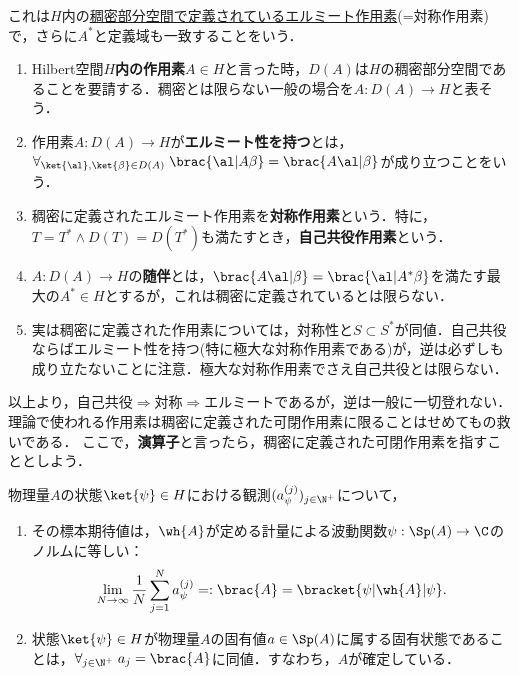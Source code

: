 \documentclass[uplatex,dvipdfmx]{jsreport}
\begin{document}
\begin{remark}
    これは$H$内の\underline{稠密部分空間で定義されているエルミート作用素}(=対称作用素)で，さらに$A^*$と定義域も一致することをいう．
    \begin{enumerate}
        \item Hilbert空間\textbf{$H$内の作用素}$A\in H$と言った時，$D(A)$は$H$の稠密部分空間であることを要請する．稠密とは限らない一般の場合を$A:D(A)\to H$と表そう．
        \item 作用素$A:D(A)\to H$が\textbf{エルミート性を持つ}とは，$\forall_{\ket{\al},\ket{\beta}\in D(A)}\;\brac{\al|A\beta}=\brac{A\al|\beta}$が成り立つことをいう．
        \item 稠密に定義されたエルミート作用素を\textbf{対称作用素}という．特に，$T=T^*\land D(T)=D(T^*)$も満たすとき，\textbf{自己共役作用素}という．
        \item $A:D(A)\to H$の\textbf{随伴}とは，$\brac{A\al|\beta}=\brac{\al|A^*\beta}$を満たす最大の$A^*\in H$とするが，これは稠密に定義されているとは限らない．
        \item 実は稠密に定義された作用素については，対称性と$S\subset S^*$が同値．自己共役ならばエルミート性を持つ(特に極大な対称作用素である)が，逆は必ずしも成り立たないことに注意．極大な対称作用素でさえ自己共役とは限らない．
    \end{enumerate}
    以上より，自己共役$\Rightarrow$対称$\Rightarrow$エルミートであるが，逆は一般に一切登れない．
    理論で使われる作用素は稠密に定義された可閉作用素に限ることはせめてもの救いである．
    ここで，\textbf{演算子}と言ったら，稠密に定義された可閉作用素を指すこととしよう．
\end{remark}

\begin{theorem}[物理量の期待値公式と揺らぎ]
    物理量$A$の状態$\ket{\psi}\in H$における観測$(a^{(j)}_\psi)_{j\in\N^+}$について，
    \begin{enumerate}
        \item その標本期待値は，$\wh{A}$が定める計量による波動関数$\psi:\Sp(A)\to\C$のノルムに等しい：
        \[\lim_{N\to\infty}\frac{1}{N}\sum_{j=1}^Na^{(j)}_\psi=:\brac{A}=\bracket{\psi|\wh{A}|\psi}.\]
        \item 状態$\ket{\psi}\in H$が物理量$A$の固有値$a\in\Sp(A)$に属する固有状態であることは，$\forall_{j\in\N^+}\;a_j=\brac{A}$に同値．すなわち，$A$が確定している．
    \end{enumerate}
\end{theorem}
\end{document}
